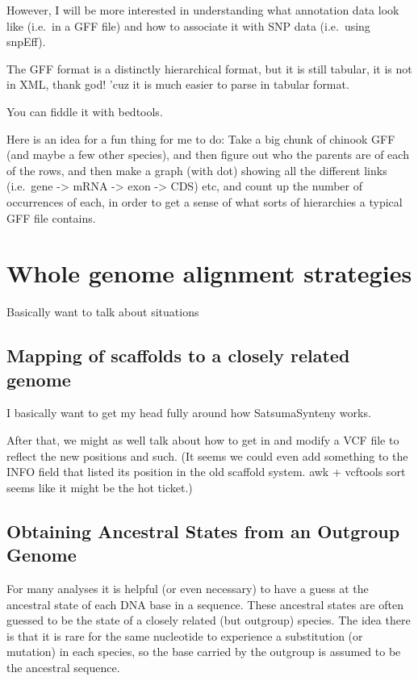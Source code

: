 \documentclass[]{krantz}
\begin{document}
However, I will be more interested in understanding what annotation data look like
(i.e.~in a GFF file) and how to associate it with SNP data (i.e.~using snpEff).

The GFF format is a distinctly hierarchical format, but it is still tabular,
it is not in XML, thank god! 'cuz it is much easier to parse in tabular format.

You can fiddle it with bedtools.

Here is an idea for a fun thing for me to do: Take a big chunk of chinook GFF
(and maybe a few other species), and then figure out who the parents are of each of the
rows, and then make a graph (with dot) showing all the different links (i.e.~gene -\textgreater{} mRNA -\textgreater{} exon -\textgreater{} CDS)
etc, and count up the number of occurrences of each, in order to get a sense of what
sorts of hierarchies a typical GFF file contains.

\hypertarget{whole-genome-alignment-strategies}{%
\chapter{Whole genome alignment strategies}\label{whole-genome-alignment-strategies}}

Basically want to talk about situations

\hypertarget{mapping-of-scaffolds-to-a-closely-related-genome}{%
\section{Mapping of scaffolds to a closely related genome}\label{mapping-of-scaffolds-to-a-closely-related-genome}}

I basically want to get my head fully around how SatsumaSynteny works.

After that, we might as well talk about how to get in and modify a VCF file to reflect the new positions and such. (It seems we could even add something to the INFO field that listed its position in the old scaffold system. awk + vcftools sort seems like it might be the hot ticket.)

\hypertarget{obtaining-ancestral-states-from-an-outgroup-genome}{%
\section{Obtaining Ancestral States from an Outgroup Genome}\label{obtaining-ancestral-states-from-an-outgroup-genome}}

For many analyses it is helpful (or even necessary) to have a guess at the ancestral
state of each DNA base in a sequence. These ancestral states are often guessed to be the
state of a closely related (but outgroup) species. The idea there is that it is rare for
the same nucleotide to experience a substitution (or mutation) in each species, so the
base carried by the outgroup is assumed to be the ancestral sequence.
\end{document}
